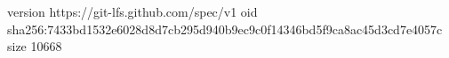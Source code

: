 version https://git-lfs.github.com/spec/v1
oid sha256:7433bd1532e6028d8d7cb295d940b9ec9c0f14346bd5f9ca8ac45d3cd7e4057c
size 10668
